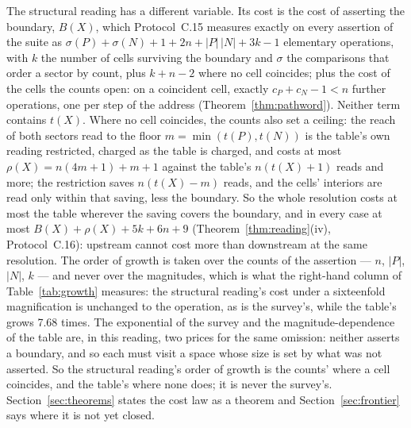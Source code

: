 \documentclass[pdflatex,sn-mathphys-num]{sn-jnl}
\theoremstyle{thmstyleone}%
\theoremstyle{thmstyletwo}%
\theoremstyle{thmstylethree}%
\newcommand{\growthMTable}{7.68}
\begin{document}
The structural reading has a different variable. Its cost is the cost of asserting the boundary, $B(X)$, which Protocol~C.15 measures exactly on every assertion of the suite as $\sigma(P)+\sigma(N)+1+2n+|P|\,|N|+3k-1$ elementary operations, with $k$ the number of cells surviving the boundary and $\sigma$ the comparisons that order a sector by count, plus $k+n-2$ where no cell coincides; plus the cost of the cells the counts open: on a coincident cell, exactly $c_P+c_N-1<n$ further operations, one per step of the address (Theorem~\ref{thm:pathword}). Neither term contains $t(X)$. Where no cell coincides, the counts also set a ceiling: the reach of both sectors read to the floor $m=\min(t(P),t(N))$ is the table's own reading restricted, charged as the table is charged, and costs at most $\rho(X)=n(4m+1)+m+1$ against the table's $n(t(X)+1)$ reads and more; the restriction saves $n(t(X)-m)$ reads, and the cells' interiors are read only within that saving, less the boundary. So the whole resolution costs at most the table wherever the saving covers the boundary, and in every case at most $B(X)+\rho(X)+5k+6n+9$ (Theorem~\ref{thm:reading}(iv), Protocol~C.16): upstream cannot cost more than downstream at the same resolution. The order of growth is taken over the counts of the assertion --- $n$, $|P|$, $|N|$, $k$ --- and never over the magnitudes, which is what the right-hand column of Table~\ref{tab:growth} measures: the structural reading's cost under a sixteenfold magnification is unchanged to the operation, as is the survey's, while the table's grows \growthMTable{} times. The exponential of the survey and the magnitude-dependence of the table are, in this reading, two prices for the same omission: neither asserts a boundary, and so each must visit a space whose size is set by what was not asserted. So the structural reading's order of growth is the counts' where a cell coincides, and the table's where none does; it is never the survey's. Section~\ref{sec:theorems} states the cost law as a theorem and Section~\ref{sec:frontier} says where it is not yet closed.
\end{document}
